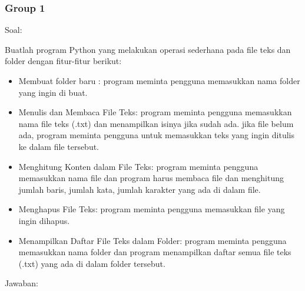 \documentclass[12pt]{article}
\begin{document}
\subsubsection{Group 1}
Soal:
\par Buatlah program Python yang melakukan operasi sederhana pada file teks dan folder dengan fitur-fitur berikut:
\begin{itemize}
    \item Membuat folder baru : program meminta pengguna memasukkan nama folder yang ingin di buat.
    \item Menulis dan Membaca File Teks: program meminta pengguna memasukkan nama file teks (.txt) dan menampilkan isinya jika sudah ada. jika file belum ada, program meminta pengguna untuk memasukkan teks yang ingin ditulis ke dalam file tersebut.
    \item Menghitung Konten dalam File Teks: program meminta pengguna memasukkan nama file dan program harus membaca file dan menghitung jumlah baris, jumlah kata, jumlah karakter yang ada di dalam file.
    \item Menghapus File Teks: program meminta pengguna memasukkan file yang ingin dihapus.
    \item Menampilkan Daftar File Teks dalam Folder: program meminta pengguna memasukkan nama folder dan program menampilkan daftar semua file teks (.txt) yang ada di dalam folder tersebut.
\end{itemize}
Jawaban:
\end{document}

